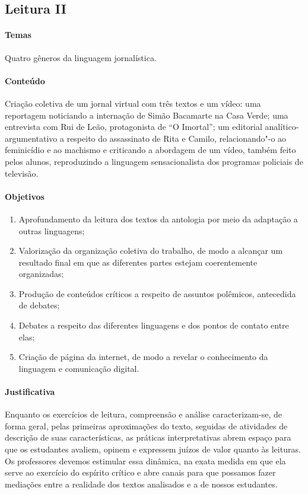 \documentclass{extarticle}
\begin{document}
\subsection{Leitura II}


\paragraph{Temas} Quatro gêneros da linguagem jornalística.

\paragraph{Conteúdo} Criação coletiva de um jornal virtual com três textos
e um vídeo: uma reportagem noticiando a internação de Simão Bacamarte na
Casa Verde; uma entrevista com Rui de Leão, protagonista de ``O
Imortal''; um editorial analítico-argumentativo a respeito do
assassinato de Rita e Camilo, relacionando"-o ao feminicídio e ao
machismo e criticando a abordagem de um vídeo, também
feito pelos alunos, reproduzindo a linguagem sensacionalista dos
programas policiais de televisão.

\paragraph{Objetivos}
\begin{enumerate}
\item Aprofundamento da leitura dos textos da antologia
por meio da adaptação a outras linguagens; 
\item Valorização da organização
coletiva do trabalho, de modo a alcançar um resultado final em que as
diferentes partes estejam coerentemente organizadas; 
\item Produção de
conteúdos críticos a respeito de assuntos polêmicos, antecedida de
debates; 
\item Debates a respeito das diferentes linguagens e dos pontos de
contato entre elas; 
\item Criação de página da internet, de modo a revelar
o conhecimento da linguagem e comunicação digital.
\end{enumerate}

\paragraph{Justificativa} Enquanto os exercícios de leitura, compreensão e
análise caracterizam-se, de forma geral, pelas primeiras aproximações do
texto, seguidas de atividades de descrição de suas características, as
práticas interpretativas abrem espaço para que os estudantes avaliem,
opinem e expressem juízos de valor quanto às leituras. Os professores
devemos estimular essa dinâmica, na exata medida em que ela serve ao
exercício do espírito crítico e abre canais para que possamos fazer
mediações entre a realidade dos textos analisados e a de nossos
estudantes.
\end{document}
